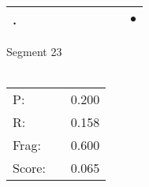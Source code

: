 \documentclass[landscape]{article}
\newcommand{\ssp}{\hspace{2pt}}
\newcommand{\mex}{\cellcolor{g}$\bullet$}
\begin{document}
\begin{tabular}{|l|p{10pt}|p{10pt}|p{10pt}|p{10pt}|p{10pt}|p{10pt}|p{10pt}|p{10pt}|p{10pt}|}
\hline
\ssp \cellcolor{ref8}. \ssp&\hspace{2pt}&\hspace{2pt}&\hspace{2pt}&\hspace{2pt}&\hspace{2pt}&\hspace{2pt}&\hspace{2pt}&\hspace{2pt}&\hspace{2pt}\mex\\
\hline
\end{tabular}

\vspace{6pt}
\noindent Segment 23\\\\
\noindent\begin{tabular}{lm{12pt}r}
\hline
P:&&0.200\\
R:&&0.158\\
Frag:&&0.600\\
Score:&&0.065\\
\end{tabular}

\newpage
\end{document}
